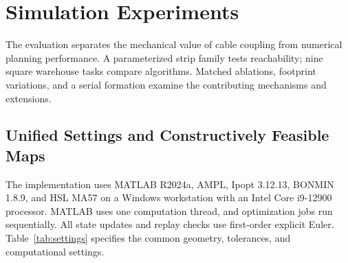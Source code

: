\section{Simulation Experiments}
The evaluation separates the mechanical value of cable coupling from numerical planning performance. A parameterized strip family tests reachability; nine square warehouse tasks compare algorithms. Matched ablations, footprint variations, and a serial formation examine the contributing mechanisms and extensions.

\subsection{Unified Settings and Constructively Feasible Maps}
The implementation uses MATLAB R2024a, AMPL, Ipopt 3.12.13, BONMIN 1.8.9, and HSL MA57 on a Windows workstation with an Intel Core i9-12900 processor. MATLAB uses one computation thread, and optimization jobs run sequentially. All state updates and replay checks use first-order explicit Euler. Table~\ref{tab:settings} specifies the common geometry, tolerances, and computational settings.


